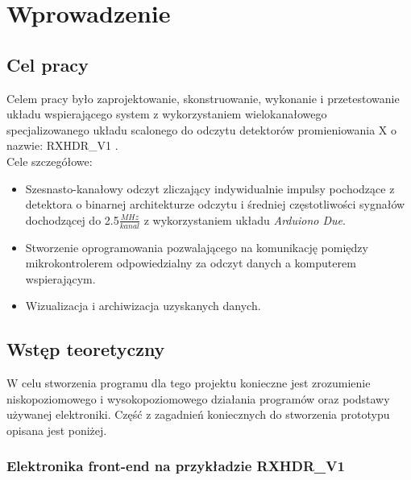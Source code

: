 \section{Wprowadzenie}
\subsection{Cel pracy}
\label{cel pracy}

Celem pracy było zaprojektowanie, skonstruowanie, wykonanie i przetestowanie  układu wspierającego system z wykorzystaniem wielokanałowego  specjalizowanego układu scalonego do odczytu detektorów promieniowania X o nazwie: RXHDR\_V1 \cite{master}.\\
Cele szczegółowe:
\begin{itemize}
        \item Szesnasto-kanałowy odczyt zliczający indywidualnie impulsy pochodzące z detektora o binarnej architekturze odczytu i średniej częstotliwości sygnałów dochodzącej do 2.5$\frac{MHz}{kanal}$ z wykorzystaniem układu \textit{Arduiono Due}.
        \item Stworzenie oprogramowania pozwalającego na komunikację pomiędzy mikrokontrolerem odpowiedzialny za odczyt danych a komputerem wspierającym. 
        \item Wizualizacja i archiwizacja uzyskanych danych. 
\end{itemize}

\subsection{Wstęp teoretyczny}

W celu stworzenia programu dla tego projektu konieczne jest zrozumienie niskopoziomowego i wysokopoziomowego działania programów oraz podstawy używanej elektroniki. Część z zagadnień koniecznych do stworzenia prototypu opisana jest poniżej. 

\subsubsection{Elektronika front-end na przykładzie RXHDR\_V1}


